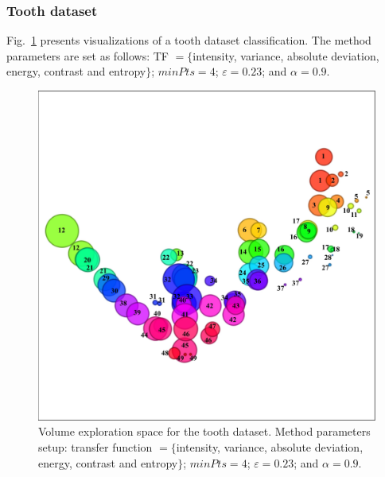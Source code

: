 \subsubsection{Tooth dataset}
\label{subsubsect:tooth-dataset}
Fig.~\ref{fig:tooth-clusters} presents  visualizations of a tooth dataset classification. The method parameters are set as follows:  TF $= \{$intensity, variance, absolute deviation, energy, contrast and entropy$\}$; $minPts = 4$; $\varepsilon = 0.23$; and $\alpha = 0.9$.

\begin{figure}[htb!]
    \centering
    \includegraphics[width=0.7\columnwidth]{figs/tooth-clusters-tf.jpg} 
    \caption{Volume exploration space for the tooth dataset. Method parameters setup: transfer function $ =\{$intensity, variance, absolute deviation, energy, contrast and entropy$\}$; $minPts = 4$; $\varepsilon = 0.23$; and $\alpha = 0.9$.}
    \label{fig:tooth-clusters}
\end{figure}


